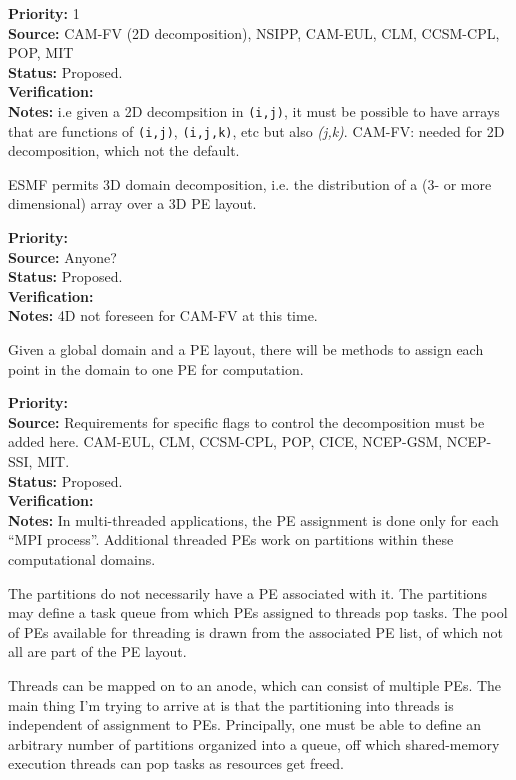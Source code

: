 \begin{reqlist}
{\bf Priority:} 1 \\ 
{\bf Source:} CAM-FV (2D decomposition), NSIPP, CAM-EUL, CLM, CCSM-CPL, POP, MIT \\
{\bf Status:} Proposed. \\
{\bf Verification:} \\
{\bf Notes:} i.e given a 2D decompsition in \texttt{(i,j)}, it must be
  possible to have arrays that are functions of \texttt{(i,j)},
  \texttt{(i,j,k)}, etc but also \emph{(j,k)}.  CAM-FV: needed for
  2D decomposition, which not the default.
\end{reqlist}


ESMF permits 3D domain decomposition, i.e. the distribution of a
(3- or more dimensional) array over a 3D PE layout.

\begin{reqlist}
{\bf Priority:} \\
{\bf Source:} Anyone? \\
{\bf Status:} Proposed. \\
{\bf Verification:} \\
{\bf Notes:} 4D not foreseen for CAM-FV at this time.
\end{reqlist}


Given a global domain and a PE layout, there will be methods to assign
each point in the domain to one PE for computation. 

\begin{reqlist}
{\bf Priority:} \\ 
{\bf Source:} Requirements for specific flags to control the
  decomposition must be added here. CAM-EUL, CLM, CCSM-CPL, POP, CICE, NCEP-GSM, NCEP-SSI, MIT. \\
{\bf Status:} Proposed. \\
{\bf Verification:} \\
{\bf Notes:} In multi-threaded applications, the PE assignment is done
  only for each ``MPI process''. Additional threaded PEs work on
  partitions within these computational domains.
  
  The partitions do not necessarily have a PE associated with it. The
  partitions may define a task queue from which PEs assigned to
  threads pop tasks. The pool of PEs available for threading is drawn
  from the associated PE list, of which not all are part of the PE
  layout.
  
  Threads can be mapped on to an anode, which can consist of multiple
  PEs.  The main thing I'm trying to arrive at is that the
  partitioning into threads is independent of assignment to PEs.
  Principally, one must be able to define an arbitrary number of
  partitions organized into a queue, off which shared-memory execution
  threads can pop tasks as resources get freed.
\end{reqlist}

